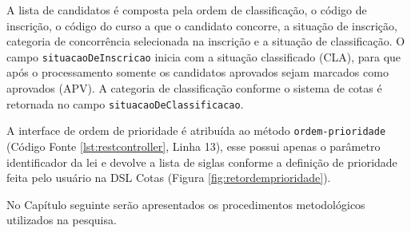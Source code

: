 A lista de candidatos é composta pela ordem de classificação, o código de inscrição, o código do curso a que o candidato concorre, a situação de inscrição, categoria de concorrência selecionada na inscrição e a situação de classificação. O campo \texttt{situacaoDeInscricao} inicia com a situação classificado (CLA), para que após o processamento somente os candidatos aprovados sejam marcados como aprovados (APV). A categoria de classificação conforme o sistema de cotas é retornada no campo \texttt{situacaoDeClassificacao}.

\newpage
A interface de ordem de prioridade é atribuída ao método \texttt{ordem-prioridade} (Código Fonte \ref{lst:restcontroller}, Linha 13), esse possui apenas o parâmetro identificador da lei e devolve a lista de siglas conforme a definição de prioridade feita pelo usuário na DSL Cotas (Figura \ref{fig:retordemprioridade}).



\newpage
No Capítulo seguinte serão apresentados os procedimentos metodológicos utilizados na pesquisa.